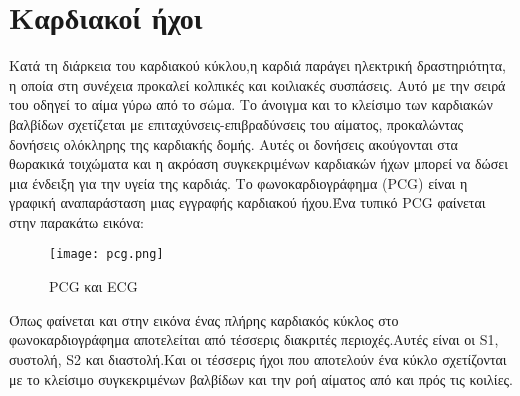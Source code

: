 \section{Καρδιακοί ήχοι}

Κατά τη διάρκεια του καρδιακού κύκλου,η καρδιά παράγει ηλεκτρική δραστηριότητα,
η οποία στη συνέχεια προκαλεί κολπικές και κοιλιακές συσπάσεις. Αυτό με την
σειρά του οδηγεί το αίμα γύρω από το σώμα. Το άνοιγμα και το κλείσιμο των
καρδιακών βαλβίδων σχετίζεται με επιταχύνσεις-επιβραδύνσεις του αίματος,
προκαλώντας δονήσεις ολόκληρης της καρδιακής δομής. Αυτές οι δονήσεις ακούγονται
στα θωρακικά τοιχώματα και η ακρόαση συγκεκριμένων καρδιακών ήχων μπορεί να
δώσει μια ένδειξη για την υγεία της καρδιάς. Το φωνοκαρδιογράφημα (PCG) είναι η
γραφική αναπαράσταση μιας εγγραφής καρδιακού ήχου.Ένα τυπικό PCG φαίνεται στην
παρακάτω εικόνα:

\begin{figure}[H]
	\texttt{[image: pcg.png]}
	\caption{PCG και ECG \cite{clifford2016classification}}
	\label{PCG}
\end{figure}

Όπως φαίνεται και στην εικόνα ένας πλήρης καρδιακός κύκλος στο φωνοκαρδιογράφημα
αποτελείται από τέσσερις διακριτές περιοχές.Αυτές είναι οι S1, συστολή, S2 και
διαστολή.Και οι τέσσερις ήχοι που αποτελούν ένα κύκλο σχετίζονται με το κλείσιμο
συγκεκριμένων βαλβίδων και την ροή αίματος από και πρός τις κοιλίες. \cite{physionet}
